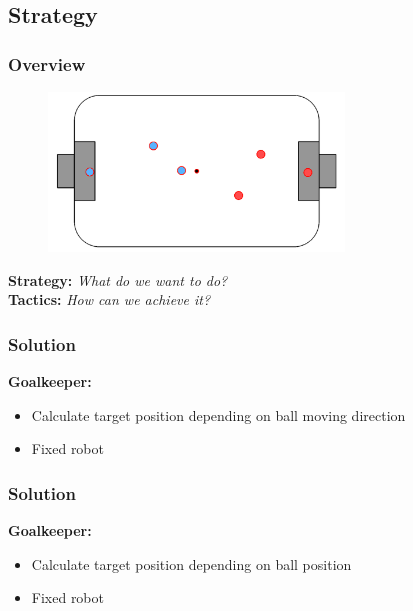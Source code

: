 \documentclass[hyperref={pdfpagelabels=false},compress]{beamer}
\begin{document}
\subsection{Strategy}
\begin{frame}
    \frametitle{Overview}
    \begin{figure}
        \includegraphics[width=0.7\textwidth]{Pictures/strategy}
    \end{figure}
    \textbf{Strategy:} \textit{What do we want to do?}\\
    \textbf{Tactics:} \textit{How can we achieve it?}
\end{frame}

\begin{frame}
		\frametitle{Solution}
		\textbf{Goalkeeper:}\\
		\begin{itemize}
				\item Calculate target position depending on ball moving direction\\
				\item Fixed robot
		\end{itemize}
		\begin{center}
				
		\end{center}
\end{frame}

\begin{frame}
    \frametitle{Solution}
    \textbf{Goalkeeper:}\\
    \begin{itemize}
        \item Calculate target position depending on ball position\\
        \item Fixed robot
    \end{itemize}
    \begin{center}
        
    \end{center}
\end{frame}
\end{document}
